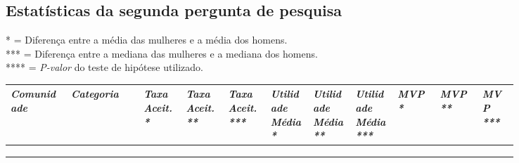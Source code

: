 \begin{landscape}

\chapter{Estatísticas da segunda pergunta de pesquisa}
\label{app:q2}
\small
* = Diferença entre a média das mulheres e a média dos homens. \\
*** = Diferença entre a mediana das mulheres e a mediana dos homens. \\
**** = \textit{P-valor} do teste de hipótese utilizado. 

\begin{longtabu}{@{}
	p{0.1\linewidth}
	p{0.12\linewidth}
	P{0.07\linewidth}
	P{0.07\linewidth}
	P{0.07\linewidth}
	P{0.07\linewidth}
	P{0.07\linewidth}
	P{0.07\linewidth}
	P{0.07\linewidth}
	P{0.07\linewidth}
	p{0.06\linewidth}@{}}
\toprule
\textit{Comunidade}  & \textit{Categoria}  & \textit{Taxa Aceit. *} & \textit{Taxa Aceit. **} & \textit{Taxa Aceit. ***} & \textit{Utilidade Média *} & \textit{Utilidade Média **} & \textit{Utilidade Média *** }& \textit{MVP * }& \textit{MVP **} & \textit{MVP ***} \\ \midrule
\endhead

\\ \hline
\endfoot

\\
\endlastfoot


\end{longtabu}
\end{landscape}
